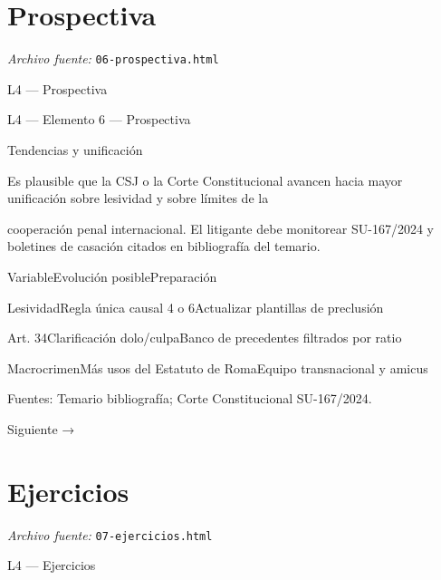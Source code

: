 \documentclass[11pt,a4paper]{article}
\begin{document}
\section{Prospectiva}
\noindent\textit{Archivo fuente:} \texttt{06-prospectiva.html}

L4 — Prospectiva\par





    L4 — Elemento 6 — Prospectiva\par
    Tendencias y unificación\par


      Es plausible que la CSJ o la Corte Constitucional avancen hacia mayor unificación sobre lesividad y sobre límites de la\par
      cooperación penal internacional. El litigante debe monitorear SU-167/2024 y boletines de casación citados en bibliografía del temario.\par





          VariableEvolución posiblePreparación\par




          LesividadRegla única causal 4 o 6Actualizar plantillas de preclusión\par

          Art. 34Clarificación dolo/culpaBanco de precedentes filtrados por ratio\par

          MacrocrimenMás usos del Estatuto de RomaEquipo transnacional y amicus\par







    Fuentes: Temario bibliografía; Corte Constitucional SU-167/2024.\par

    Siguiente →\par

\section{Ejercicios}
\noindent\textit{Archivo fuente:} \texttt{07-ejercicios.html}

L4 — Ejercicios\par
\end{document}
